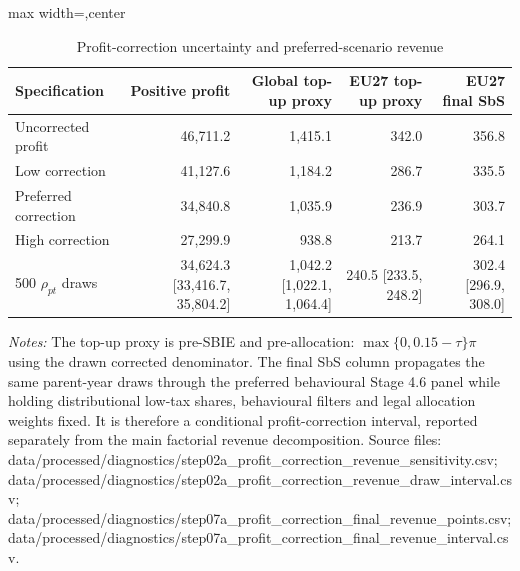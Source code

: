 \begin{table}[H]
\centering
\scriptsize
\caption{Profit-correction uncertainty and preferred-scenario revenue}
\label{tab:profit_correction_revenue_sensitivity}
\begin{adjustbox}{max width=\textwidth,center}
\begin{tabular}{@{}lrrrr@{}}
\toprule
Specification & Positive profit & Global top-up proxy & EU27 top-up proxy & EU27 final SbS \\
\midrule
Uncorrected profit & 46,711.2 & 1,415.1 & 342.0 & 356.8 \\
Low correction & 41,127.6 & 1,184.2 & 286.7 & 335.5 \\
Preferred correction & 34,840.8 & 1,035.9 & 236.9 & 303.7 \\
High correction & 27,299.9 &   938.8 & 213.7 & 264.1 \\
500 $\rho_{pt}$ draws & 34,624.3 [33,416.7, 35,804.2] & 1,042.2 [1,022.1, 1,064.4] & 240.5 [233.5, 248.2] & 302.4 [296.9, 308.0] \\
\bottomrule
\end{tabular}
\end{adjustbox}

\vspace{0.5em}
\begin{minipage}{0.96\textwidth}
\footnotesize\raggedright \textit{Notes:} The top-up proxy is pre-SBIE and pre-allocation: $\max\{0,0.15-\tau\}\pi$ using the drawn corrected denominator. The final SbS column propagates the same parent-year draws through the preferred behavioural Stage 4.6 panel while holding distributional low-tax shares, behavioural filters and legal allocation weights fixed. It is therefore a conditional profit-correction interval, reported separately from the main factorial revenue decomposition. Source files: data/processed/diagnostics/step02a\_profit\_correction\_revenue\_sensitivity.csv; data/processed/diagnostics/step02a\_profit\_correction\_revenue\_draw\_interval.csv; data/processed/diagnostics/step07a\_profit\_correction\_final\_revenue\_points.csv; data/processed/diagnostics/step07a\_profit\_correction\_final\_revenue\_interval.csv.
\end{minipage}
\end{table}
